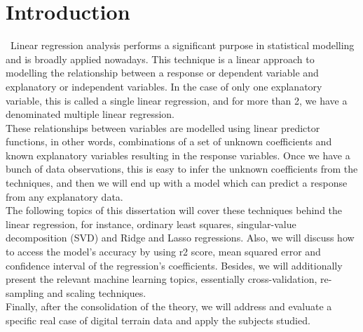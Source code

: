 \section{Introduction}

\quad \, Linear regression analysis performs a significant purpose in statistical modelling and is broadly applied nowadays. This technique is a linear approach to modelling the relationship between a response or dependent variable and explanatory or independent variables. In the case of only one explanatory variable, this is called a single linear regression, and for more than 2, we have a denominated multiple linear regression.\\

These relationships between variables are modelled using linear predictor functions, in other words, combinations of a set of unknown coefficients and known explanatory variables resulting in the response variables. Once we have a bunch of data observations, this is easy to infer the unknown coefficients from the techniques, and then we will end up with a model which can predict a response from any explanatory data.\\

The following topics of this dissertation will cover these techniques behind the linear regression, for instance, ordinary least squares, singular-value decomposition (SVD) and Ridge and Lasso regressions. Also, we will discuss how to access the model's accuracy by using r2 score, mean squared error and confidence interval of the regression's coefficients. Besides, we will additionally present the relevant machine learning topics, essentially cross-validation, re-sampling and scaling techniques.\\

Finally, after the consolidation of the theory, we will address and evaluate a specific real case of digital terrain data and apply the subjects studied.\\
